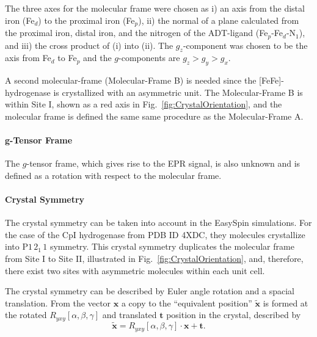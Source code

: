 The three axes for the molecular frame were chosen as i) an axis from the distal iron (Fe$_d$) to the proximal iron (Fe$_p$), ii) the normal of a plane calculated from the proximal iron, distal iron, and the nitrogen of the ADT-ligand  (Fe$_p$-Fe$_d$-N$_1$), and iii) the cross product of (i) into (ii). The $g_z$-component was chosen to be the axis from Fe$_d$ to Fe$_p$ and the $g$-components are $g_z>g_y>g_x$. 

A second molecular-frame (Molecular-Frame B) is needed since the [FeFe]-hydrogenase is crystallized with an asymmetric unit. The Molecular-Frame B is within Site I, shown as a red axis in Fig.~\ref{fig:CrystalOrientation}, and the molecular frame is defined the same same procedure as the Molecular-Frame A. 

\paragraph{g-Tensor Frame} The $g$-tensor frame, which gives rise to the EPR signal, is also unknown and is defined as a rotation with respect to the molecular frame.

\paragraph*{Crystal Symmetry} The crystal symmetry can be taken into account in the EasySpin simulations. For the case of the CpI hydrogenase from PDB ID 4XDC, they molecules crystallize into P$1\,2_1\,1$ symmetry. This crystal symmetry duplicates the molecular frame from Site I to Site II, illustrated in Fig.~\ref{fig:CrystalOrientation}, and, therefore, there exist two sites with asymmetric molecules within each unit cell.

The crystal symmetry can be described by Euler angle rotation and a spacial translation. \cite{hovmoller1981rotation} From the vector $\mathbf{x}$ a copy to the ``equivalent position'' $\mathbf{\tilde{x}}$ is formed at the rotated $R_{yxy}[\alpha,\beta,\gamma]$ and translated $\mathbf{t}$ position in the crystal, described by
\begin{equation}
\mathbf{\tilde{x}} = R_{yxy}[\alpha,\beta,\gamma] \cdot \mathbf{x} + \mathbf{t}.
\end{equation}


